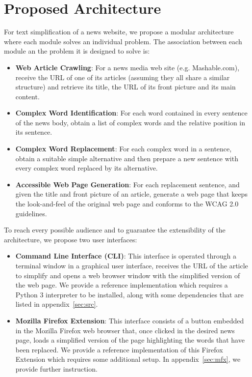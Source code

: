 \documentclass[11pt,a4paper]{article}
\begin{document}
\section{Proposed Architecture}

For text simplification of a news website, we propose a modular architecture where each module solves an individual problem. The association between each module an the problem it is designed to solve is:

\begin{itemize}
	\item{\textbf{Web Article Crawling}: For a news media web site (e.g. Mashable.com), receive the URL of one of its articles (assuming they all share a similar structure) and retrieve its title, the URL of its front picture and its main content.}
	\item{\textbf{Complex Word Identification}: For each word contained in every sentence of the news body, obtain a list of complex words and the relative position in its sentence.}
	\item{\textbf{Complex Word Replacement}: For each complex word in a sentence, obtain a suitable simple alternative and then prepare a new sentence with every complex word replaced by its alternative.}
	\item{\textbf{Accessible Web Page Generation}: For each replacement sentence, and given the title and front picture of an article, generate a web page that keeps the look-and-feel of the original web page and conforms to the WCAG 2.0~\cite{caldwell2008web} guidelines.}
\end{itemize}

To reach every possible audience and to guarantee the extensibility of the architecture, we propose two user interfaces:

\begin{itemize}
	\item{\textbf{Command Line Interface (CLI)}: This interface is operated through a terminal window in a graphical user interface, receives the URL of the article to simplify and opens a web browser window with the simplified version of the web page. We provide a reference implementation which requires a Python 3 interpreter to be installed, along with some dependencies that are listed in appendix~\ref{sec:src}}.
	\item{\textbf{Mozilla Firefox Extension}: This interface consists of a button embedded in the Mozilla Firefox web browser that, once clicked in the desired news page, loads a simplified version of the page highlighting the words that have been replaced. We provide a reference implementation of this Firefox Extension which requires some additional setup. In appendix~\ref{sec:mfx}, we provide further instruction.}
\end{itemize}
\end{document}
